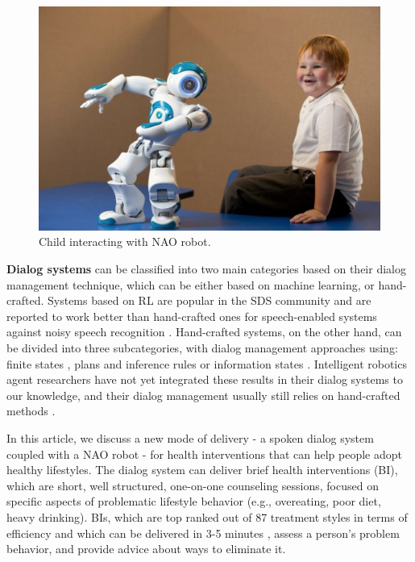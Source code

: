 \documentclass[letterpaper]{article}
\begin{document}
\begin{sloppy}
 \begin{figure}
 \centering
 \includegraphics[width=\columnwidth]{figures/ObeseChild-NAO-cropped.png}
 \caption{Child interacting with NAO robot.}
 \label{q-values}
 \end{figure}

{\bf Dialog systems} can be classified into two main categories based on their dialog management 
technique, which can be either based on machine learning, or hand-crafted.  Systems based on RL are 
popular in the SDS community and are reported to work better than hand-crafted ones for  
speech-enabled systems against noisy speech recognition \cite{young2013pomdp}. 
Hand-crafted systems, on the other hand, can be divided into three subcategories, with dialog 
management approaches using: finite states \cite{sutton1998CSLU}, plans and inference rules 
\cite{ferguson1998trips,Bohus2009} or information states \cite{Traum03}. Intelligent robotics agent 
researchers have not yet integrated these results in their dialog systems to our knowledge, and their dialog management usually still relies on 
hand-crafted methods \cite{morbiniFlores2012,Bickmore2010}. 

In this article, we discuss a new mode of delivery - a spoken dialog system coupled with a NAO robot - 
for health interventions that can help people adopt healthy lifestyles.  The dialog system can 
deliver brief health interventions (BI), which are short, well structured, one-on-one counseling 
sessions, focused on specific aspects of problematic lifestyle behavior (e.g., overeating, poor 
diet, 
heavy drinking). BIs, which are top ranked out of 87 treatment styles in terms of efficiency 
\cite{miller2002mesa} and which can be delivered in 3-5 minutes \cite{Moyer2002}, assess a person's 
problem behavior, and provide advice about ways to eliminate it. 



\end{sloppy}
\end{document}
